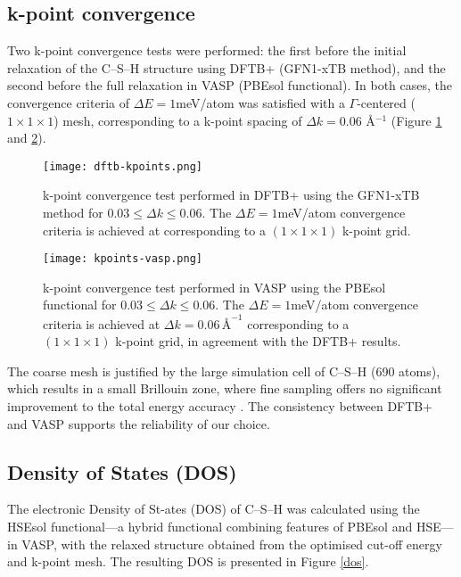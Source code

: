 \subsection{k-point convergence}
 Two k-point convergence tests were performed: the first before the initial relaxation of the C--S--H structure using DFTB+ (GFN1-xTB method), and the second before the full relaxation in VASP (PBEsol functional). In both cases, the convergence criteria of $\Delta E = 1$meV/atom was satisfied with a $\Gamma$-centered ($1\times 1\times 1$) mesh, corresponding to a k-point spacing of $\Delta k=0.06$ Å$^{-1}$ (Figure \ref{dftb-kpoints} and \ref{kpoints-vasp}). 
\begin{figure}[H]
    \centering
    \texttt{[image: dftb-kpoints.png]}
    \caption{k-point convergence test performed in DFTB+ using the GFN1-xTB method for $0.03 \leq \Delta k \leq 0.06$. The 
    $\Delta E = 1$meV/atom convergence criteria is achieved at  corresponding to a $(1\times 1\times 1)$ k-point grid. 
    }
    \label{dftb-kpoints}
\end{figure}

\begin{figure}[H]
    \centering
    \texttt{[image: kpoints-vasp.png]}
    \caption{k-point convergence test performed in VASP using the PBEsol functional for $0.03 \leq \Delta k \leq 0.06$. The $\Delta E = 1$meV/atom convergence criteria is achieved at $\Delta k = 0.06 \,\text{\AA}^{-1}$ corresponding to a $(1\times 1\times 1)$ k-point grid, in agreement with the DFTB+ results.
    }
    \label{kpoints-vasp}
\end{figure}
The coarse mesh is justified by the large simulation cell of C--S--H (690 atoms), which results in a small Brillouin zone, where fine sampling offers no significant improvement to the total energy accuracy \cite{Kresse1996}. The consistency between DFTB+ and VASP supports the reliability of our choice.  
\subsection{Density of States (DOS)}
The electronic Density of St-ates (DOS) of C--S--H was calculated using the HSEsol functional---a hybrid functional combining features of PBEsol and HSE---\cite{Schimka2011} in VASP, with the relaxed structure obtained from the optimised cut-off energy and k-point mesh. The resulting DOS is presented in Figure \ref{dos}.

